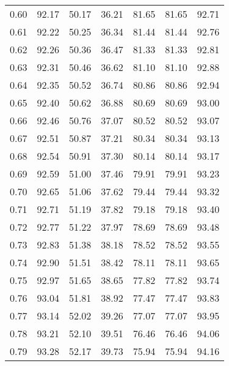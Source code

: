 \begin{tabular}{|c|c|c|c|c|c|c|}
      0.60 &     92.17 &     50.17 &      36.21 &   81.65 &      81.65 &         92.71 \\
      0.61 &     92.22 &     50.25 &      36.34 &   81.44 &      81.44 &         92.76 \\
      0.62 &     92.26 &     50.36 &      36.47 &   81.33 &      81.33 &         92.81 \\
      0.63 &     92.31 &     50.46 &      36.62 &   81.10 &      81.10 &         92.88 \\
      0.64 &     92.35 &     50.52 &      36.74 &   80.86 &      80.86 &         92.94 \\
      0.65 &     92.40 &     50.62 &      36.88 &   80.69 &      80.69 &         93.00 \\
      0.66 &     92.46 &     50.76 &      37.07 &   80.52 &      80.52 &         93.07 \\
      0.67 &     92.51 &     50.87 &      37.21 &   80.34 &      80.34 &         93.13 \\
      0.68 &     92.54 &     50.91 &      37.30 &   80.14 &      80.14 &         93.17 \\
      0.69 &     92.59 &     51.00 &      37.46 &   79.91 &      79.91 &         93.23 \\
      0.70 &     92.65 &     51.06 &      37.62 &   79.44 &      79.44 &         93.32 \\
      0.71 &     92.71 &     51.19 &      37.82 &   79.18 &      79.18 &         93.40 \\
      0.72 &     92.77 &     51.22 &      37.97 &   78.69 &      78.69 &         93.48 \\
      0.73 &     92.83 &     51.38 &      38.18 &   78.52 &      78.52 &         93.55 \\
      0.74 &     92.90 &     51.51 &      38.42 &   78.11 &      78.11 &         93.65 \\
      0.75 &     92.97 &     51.65 &      38.65 &   77.82 &      77.82 &         93.74 \\
      0.76 &     93.04 &     51.81 &      38.92 &   77.47 &      77.47 &         93.83 \\
      0.77 &     93.14 &     52.02 &      39.26 &   77.07 &      77.07 &         93.95 \\
      0.78 &     93.21 &     52.10 &      39.51 &   76.46 &      76.46 &         94.06 \\
      0.79 &     93.28 &     52.17 &      39.73 &   75.94 &      75.94 &         94.16 \\

\end{tabular}
